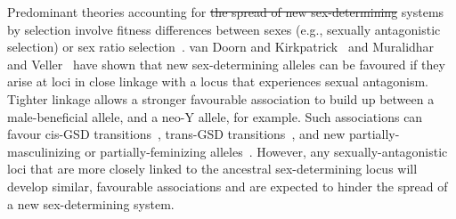 \documentclass[10pt,letterpaper]{article}
\providecommand{\DIFadd}[1]{{\protect\color{blue}\uwave{#1}}} %
\providecommand{\DIFdel}[1]{{\protect\color{red}\sout{#1}}}                      %
\providecommand{\DIFaddbegin}{} %
\providecommand{\DIFaddend}{} %
\providecommand{\DIFdelbegin}{} %
\providecommand{\DIFdelend}{} %
\begin{document}
Predominant theories accounting for \DIFdelbegin \DIFdel{the spread of new sex-determining }\DIFdelend \DIFaddbegin \DIFadd{transitions between GSD }\DIFaddend systems by selection involve fitness differences between sexes (e.g., sexually antagonistic selection) or sex ratio selection~\cite{Blaser2012, Beukeboom:2014vb,vanDoorn2014re}. 
van Doorn and Kirkpatrick~\cite{vanDoorn:2007eu,vanDoorn:2010hu} and Muralidhar and Veller~\cite{Muralidhar2018} have shown that new sex-determining alleles can be favoured if they arise at loci in close linkage with a locus that experiences sexual antagonism. 
Tighter linkage allows a stronger favourable association to build up between a male-beneficial allele, and a neo-Y allele, for example. 
Such associations can favour cis-GSD transitions~\cite{vanDoorn:2007eu}, trans-GSD transitions~\cite{vanDoorn:2010hu}, and new partially-masculinizing or partially-feminizing alleles~\cite{Muralidhar2018}.
However, any sexually-antagonistic loci that are more closely linked to the ancestral sex-determining locus will develop similar, favourable associations and are expected to hinder the spread of a new sex-determining system. 
\end{document}
